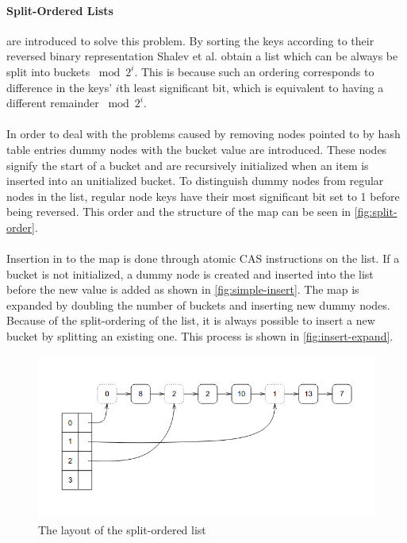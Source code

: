 \documentclass{uit-thesis}
\begin{document}
\paragraph{Split-Ordered Lists}
are introduced to solve this problem. By sorting the keys according to their reversed binary representation Shalev et al. obtain a list which can be always be split into buckets $\bmod{2^i}$. This is because such an ordering corresponds to difference in the keys' $i$th least significant bit, which is equivalent to having a different remainder $\bmod{2^i}$.
\\\\
In order to deal with the problems caused by removing nodes pointed to by hash table entries dummy nodes with the bucket value are introduced. These nodes signify the start of a bucket and are recursively initialized when an item is inserted into an unitialized bucket. To distinguish dummy nodes from regular nodes in the list, regular node keys have their most significant bit set to 1 before being reversed. This order and the structure of the map can be seen in \autoref{fig:split-order}.
\\\\
Insertion in to the map is done through atomic CAS instructions on the list. If a bucket is not initialized, a dummy node is created and inserted into the list before the new value is added as shown in \autoref{fig:simple-insert}. The map is expanded by doubling the number of buckets and inserting new dummy nodes. Because of the split-ordering of the list, it is always possible to insert a new bucket by splitting an existing one. This process is shown in \autoref{fig:insert-expand}.
\begin{figure}
    \includegraphics[width=\textwidth]{split-ordered-list-diagram.png}
\caption{The layout of the split-ordered list}
\label{fig:split-order}
\end{figure}
\end{document}
